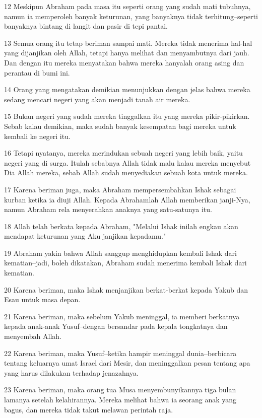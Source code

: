 \par 12 Meskipun Abraham pada masa itu seperti orang yang sudah mati tubuhnya, namun ia memperoleh banyak keturunan, yang banyaknya tidak terhitung--seperti banyaknya bintang di langit dan pasir di tepi pantai.
\par 13 Semua orang itu tetap beriman sampai mati. Mereka tidak menerima hal-hal yang dijanjikan oleh Allah, tetapi hanya melihat dan menyambutnya dari jauh. Dan dengan itu mereka menyatakan bahwa mereka hanyalah orang asing dan perantau di bumi ini.
\par 14 Orang yang mengatakan demikian menunjukkan dengan jelas bahwa mereka sedang mencari negeri yang akan menjadi tanah air mereka.
\par 15 Bukan negeri yang sudah mereka tinggalkan itu yang mereka pikir-pikirkan. Sebab kalau demikian, maka sudah banyak kesempatan bagi mereka untuk kembali ke negeri itu.
\par 16 Tetapi nyatanya, mereka merindukan sebuah negeri yang lebih baik, yaitu negeri yang di surga. Itulah sebabnya Allah tidak malu kalau mereka menyebut Dia Allah mereka, sebab Allah sudah menyediakan sebuah kota untuk mereka.
\par 17 Karena beriman juga, maka Abraham mempersembahkan Ishak sebagai kurban ketika ia diuji Allah. Kepada Abrahamlah Allah memberikan janji-Nya, namun Abraham rela menyerahkan anaknya yang satu-satunya itu.
\par 18 Allah telah berkata kepada Abraham, "Melalui Ishak inilah engkau akan mendapat keturunan yang Aku janjikan kepadamu."
\par 19 Abraham yakin bahwa Allah sanggup menghidupkan kembali Ishak dari kematian--jadi, boleh dikatakan, Abraham sudah menerima kembali Ishak dari kematian.
\par 20 Karena beriman, maka Ishak menjanjikan berkat-berkat kepada Yakub dan Esau untuk masa depan.
\par 21 Karena beriman, maka sebelum Yakub meninggal, ia memberi berkatnya kepada anak-anak Yusuf--dengan bersandar pada kepala tongkatnya dan menyembah Allah.
\par 22 Karena beriman, maka Yusuf--ketika hampir meninggal dunia--berbicara tentang keluarnya umat Israel dari Mesir, dan meninggalkan pesan tentang apa yang harus dilakukan terhadap jenazahnya.
\par 23 Karena beriman, maka orang tua Musa menyembunyikannya tiga bulan lamanya setelah kelahirannya. Mereka melihat bahwa ia seorang anak yang bagus, dan mereka tidak takut melawan perintah raja.
